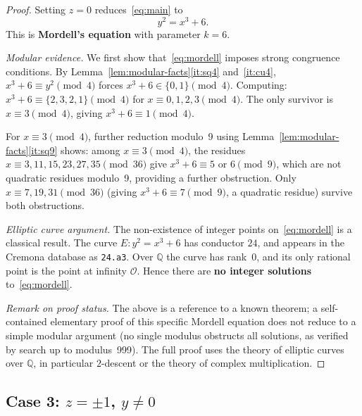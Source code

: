 \documentclass[12pt,a4paper]{article}
\theoremstyle{definition}
\newcommand{\Q}{\mathbb{Q}}
\begin{document}
\begin{proof}
  Setting $z = 0$ reduces~\eqref{eq:main} to
  \begin{equation}\label{eq:mordell}
    y^2 = x^3 + 6.
  \end{equation}
  This is \textbf{Mordell's equation} with parameter $k = 6$.

  \medskip

  \noindent\textit{Modular evidence.}
  We first show that~\eqref{eq:mordell} imposes strong congruence conditions.
  By Lemma~\ref{lem:modular-facts}\ref{it:sq4} and~\ref{it:cu4},
  $x^3 + 6 \equiv y^2 \pmod 4$ forces $x^3 + 6 \in \{0,1\} \pmod 4$.
  Computing: $x^3 + 6 \equiv \{2,3,2,1\} \pmod 4$ for $x \equiv 0,1,2,3 \pmod 4$.
  The only survivor is $x \equiv 3 \pmod 4$, giving $x^3 + 6 \equiv 1 \pmod 4$.

  For $x \equiv 3 \pmod 4$, further reduction modulo~9 using
  Lemma~\ref{lem:modular-facts}\ref{it:sq9} shows:
  among $x \equiv 3 \pmod 4$, the residues $x \equiv 3, 11, 15, 23, 27, 35 \pmod{36}$
  give $x^3 + 6 \equiv 5$ or $6 \pmod 9$, which are not quadratic residues
  modulo~9, providing a further obstruction.
  Only $x \equiv 7, 19, 31 \pmod{36}$ (giving $x^3 + 6 \equiv 7 \pmod 9$, a
  quadratic residue) survive both obstructions.

  \medskip

  \noindent\textit{Elliptic curve argument.}
  The non-existence of integer points on~\eqref{eq:mordell} is a classical result.
  The curve $E\colon y^2 = x^3 + 6$ has conductor $24$, and appears in the
  Cremona database as \texttt{24.a3}.  Over $\Q$ the curve has rank~$0$, and
  its only rational point is the point at infinity $\mathcal{O}$.
  Hence there are \textbf{no integer solutions} to~\eqref{eq:mordell}.

  \medskip

  \noindent\textit{Remark on proof status.}
  The above is a reference to a known theorem; a self-contained elementary proof
  of this specific Mordell equation does not reduce to a simple modular argument
  (no single modulus obstructs all solutions, as verified by search up to
  modulus~999). The full proof uses the theory of elliptic curves over $\Q$,
  in particular $2$-descent or the theory of complex multiplication.
\end{proof}

\subsection{Case 3: \texorpdfstring{$z = \pm 1$, $y \neq 0$}{z = ±1, y ≠ 0}}
\end{document}
